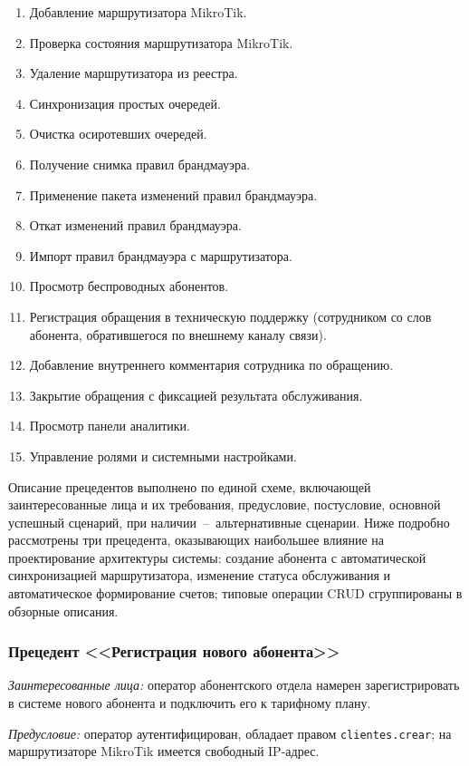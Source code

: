 \begin{enumerate}
\item Добавление маршрутизатора MikroTik.
\item Проверка состояния маршрутизатора MikroTik.
\item Удаление маршрутизатора из реестра.
\item Синхронизация простых очередей.
\item Очистка осиротевших очередей.
\item Получение снимка правил брандмауэра.
\item Применение пакета изменений правил брандмауэра.
\item Откат изменений правил брандмауэра.
\item Импорт правил брандмауэра с маршрутизатора.
\item Просмотр беспроводных абонентов.
\item Регистрация обращения в техническую поддержку (сотрудником со слов абонента, обратившегося по внешнему каналу связи).
\item Добавление внутреннего комментария сотрудника по обращению.
\item Закрытие обращения с фиксацией результата обслуживания.
\item Просмотр панели аналитики.
\item Управление ролями и системными настройками.
\end{enumerate}

Описание прецедентов выполнено по единой схеме, включающей заинтересованные лица и их требования, предусловие, постусловие, основной успешный сценарий, при наличии~--~альтернативные сценарии. Ниже подробно рассмотрены три прецедента, оказывающих наибольшее влияние на проектирование архитектуры системы: создание абонента с автоматической синхронизацией маршрутизатора, изменение статуса обслуживания и автоматическое формирование счетов; типовые операции CRUD сгруппированы в обзорные описания.

\subsubsection{Прецедент <<Регистрация нового абонента>>}

\emph{Заинтересованные лица:} оператор абонентского отдела намерен зарегистрировать в системе нового абонента и подключить его к тарифному плану.

\emph{Предусловие:} оператор аутентифицирован, обладает правом \texttt{clientes.crear}; на маршрутизаторе MikroTik имеется свободный IP-адрес.

